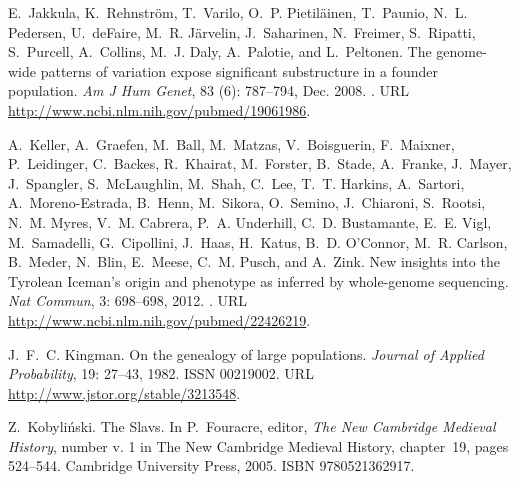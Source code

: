 \documentclass{article}
\begin{document}
\begin{thebibliography}{76}
E.~Jakkula, K.~Rehnstr{\"o}m, T.~Varilo, O.~P. Pietil{\"a}inen, T.~Paunio,
  N.~L. Pedersen, U.~deFaire, M.~R. J{\"a}rvelin, J.~Saharinen, N.~Freimer,
  S.~Ripatti, S.~Purcell, A.~Collins, M.~J. Daly, A.~Palotie, and L.~Peltonen.
\newblock The genome-wide patterns of variation expose significant substructure
  in a founder population.
\newblock \emph{Am J Hum Genet}, 83 (6): 787--794, Dec. 2008.
\newblock {}.
\newblock URL \url{http://www.ncbi.nlm.nih.gov/pubmed/19061986}.

A.~Keller, A.~Graefen, M.~Ball, M.~Matzas, V.~Boisguerin, F.~Maixner,
  P.~Leidinger, C.~Backes, R.~Khairat, M.~Forster, B.~Stade, A.~Franke,
  J.~Mayer, J.~Spangler, S.~McLaughlin, M.~Shah, C.~Lee, T.~T. Harkins,
  A.~Sartori, A.~Moreno-Estrada, B.~Henn, M.~Sikora, O.~Semino, J.~Chiaroni,
  S.~Rootsi, N.~M. Myres, V.~M. Cabrera, P.~A. Underhill, C.~D. Bustamante,
  E.~E. Vigl, M.~Samadelli, G.~Cipollini, J.~Haas, H.~Katus, B.~D. O'Connor,
  M.~R. Carlson, B.~Meder, N.~Blin, E.~Meese, C.~M. Pusch, and A.~Zink.
\newblock New insights into the {Tyrolean} {Iceman}'s origin and phenotype as
  inferred by whole-genome sequencing.
\newblock \emph{Nat Commun}, 3: 698--698, 2012.
\newblock {}.
\newblock URL \url{http://www.ncbi.nlm.nih.gov/pubmed/22426219}.

J.~F.~C. Kingman.
\newblock On the genealogy of large populations.
\newblock \emph{Journal of Applied Probability}, 19: 27--43, 1982.
\newblock ISSN 00219002.
\newblock URL \url{http://www.jstor.org/stable/3213548}.

Z.~Kobyli\'nski.
\newblock The {Slavs}.
\newblock In P.~Fouracre, editor, \emph{The New Cambridge Medieval History},
  number v. 1 in The New Cambridge Medieval History, chapter~19, pages
  524--544. Cambridge University Press, 2005.
\newblock ISBN 9780521362917.


\end{thebibliography}
\end{document}
